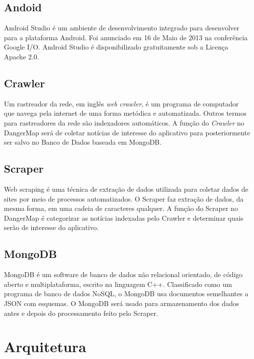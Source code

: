 \documentclass[
	12pt,				%
	openright,			%
	twoside,			%
	a4paper,			%
	english,			%
	french,				%
	spanish,			%
	brazil,				%
	]{abntex2}
\begin{document}
\section*{Andoid }

Android Studio é um ambiente de desenvolvimento integrado para desenvolver para a plataforma Android. Foi anunciado em 16 de Maio de 2013 na conferência Google I/O. Android Studio é disponibilizado gratuitamente sob a Licença Apache 2.0.

\section*{Crawler}

Um rastreador da rede, em inglês \textit{web crawler}, é um programa de computador que navega pela internet de uma forma metódica e automatizada. Outros termos para rastreadores da rede são indexadores automáticos. A função do \textit{Crawler} no DangerMap será de coletar notícias de interesse do aplicativo para posteriormente ser salvo no Banco de Dados baseada em MongoDB.

\section*{Scraper}

Web scraping é uma técnica de extração de dados utilizada para coletar dados de sites por meio de processos automatizados. O Scraper faz extração de dados, da mesma forma, em uma cadeia de caracteres qualquer. A função do Scraper no DangerMap é categorizar as notícias indexadas pelo Crawler e determinar quais serão de interesse do aplicativo.

\section*{MongoDB}

MongoDB é um software de banco de dados não relacional orientado, de código aberto e multiplataforma, escrito na linguagem C++. Classificado como um programa de banco de dados NoSQL, o MongoDB usa documentos semelhantes a JSON com esquemas. O MongoDB será usado para armazenamento dos dados antes e depois do processamento feito pelo Scraper.


\chapter{Arquitetura}
\end{document}
